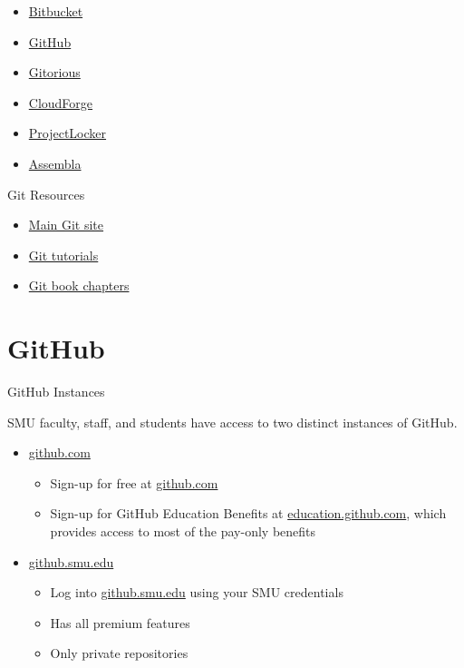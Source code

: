 \documentclass[aspectratio=169]{beamer}
\begin{document}
\begin{frame}{}

\begin{itemize}
\item
  \href{https://bitbucket.org/dashboard/overview}{Bitbucket}
\item
  \href{https://github.com/}{GitHub}
\item
  \href{https://gitorious.org/}{Gitorious}
\item
  \href{http://www.cloudforge.com/}{CloudForge}
\item
  \href{http://projectlocker.com/}{ProjectLocker}
\item
  \href{http://offers.assembla.com/free-git-hosting/}{Assembla}
\end{itemize}

\end{frame}

\begin{frame}{Git Resources}

\begin{itemize}
\item
  \href{http://git-scm.com/}{Main Git site}
\item
  \href{http://www.atlassian.com/git/tutorial}{Git tutorials}
\item
  \href{http://git-scm.com/book}{Git book chapters}
\end{itemize}

\end{frame}

\section{GitHub}

\begin{frame}{GitHub Instances}

SMU faculty, staff, and students have access to two distinct instances
of GitHub.

\begin{itemize}
\item
  \href{https://www.github.com}{github.com}

  \begin{itemize}
    \item
    Sign-up for free at \href{https://www.github.com}{github.com}
  \item
    Sign-up for GitHub Education Benefits at
    \href{https://education.github.com}{education.github.com}, which
    provides access to most of the pay-only benefits
    \end{itemize}
\item
    \href{https://github.smu.edu}{github.smu.edu}
    \begin{itemize}
  \item
    Log into \href{https://github.smu.edu}{github.smu.edu} using your
    SMU credentials
  \item
    Has all premium features
  \item
    Only private repositories
  \end{itemize}
\end{itemize}

\end{frame}
\end{document}
